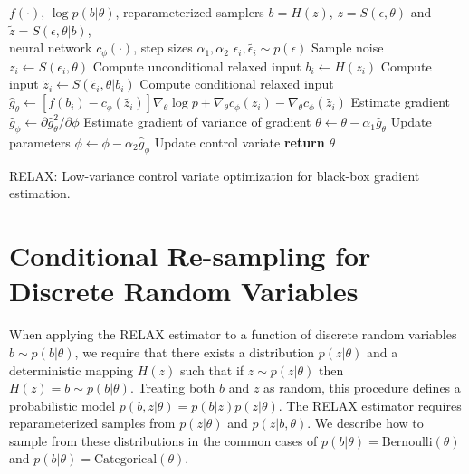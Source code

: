 \documentclass{article}
\newcommand{\RELAX}{{\textnormal{RELAX}}}
\begin{document}
\begin{algorithm}[h]
	\begin{algorithmic}
		\Require $f(\cdot)$, $\log p(b|\theta)$, reparameterized samplers $b = H(z)$, $z = S(\epsilon, \theta)$ and $\tilde{z} = S(\epsilon, \theta | b)$, \\ 
		\hspace{3em} neural network $c_\phi(\cdot)$, step sizes $\alpha_1, \alpha_2$   
		\State $\epsilon_{i}, \widetilde{\epsilon_i} \sim p(\epsilon)$ \Comment Sample noise
		\State $z_i \leftarrow S(\epsilon_i, \theta)$ \Comment Compute unconditional relaxed input
		\State $b_i \leftarrow H(z_i)$ \Comment Compute input
		\State $\widetilde{z_i} \leftarrow S(\widetilde{\epsilon_i}, \theta | b_i)$ \Comment Compute conditional relaxed input
		\State  $\hat{g}_\theta \leftarrow \left[f(b_i) - c_{\phi}(\widetilde{z_i}) \right] \nabla_\theta \log p + \nabla_\theta c_\phi(z_i) - \nabla_\theta c_\phi(\widetilde{z_i})$ \Comment Estimate gradient
		\State  $\hat{g}_\phi \leftarrow \partial \hat{g}_\theta^2 / \partial \phi$ \Comment Estimate gradient of variance of gradient
		\State $\theta \leftarrow \theta - \alpha_1 \hat{g}_\theta$ \Comment Update parameters
		\State $\phi \leftarrow \phi - \alpha_2 \hat{g}_\phi$ \Comment Update control variate
		\EndWhile
		\State \textbf{return} $\theta$ 
	\end{algorithmic}
	\caption{\RELAX{}: Low-variance control variate optimization for black-box gradient estimation.}
	\label{relax}
\end{algorithm}





\section{Conditional Re-sampling for Discrete Random Variables}
\label{resample}
When applying the RELAX estimator to a function of discrete random variables $b \sim p(b|\theta)$, we require that there exists a distribution $p(z|\theta)$ and a deterministic mapping $H(z)$ such that if $z \sim p(z|\theta)$ then $H(z) = b \sim p(b|\theta)$. Treating both $b$ and $z$ as random, this procedure defines a probabilistic model $p(b, z | \theta) = p(b|z)p(z|\theta)$. The RELAX estimator requires reparameterized samples from $p(z|\theta)$ and $p(z|b,\theta)$. We describe how to sample from these distributions in the common cases of $p(b|\theta) = \text{Bernoulli}(\theta)$ and $p(b|\theta) = \text{Categorical}(\theta)$.
\end{document}
